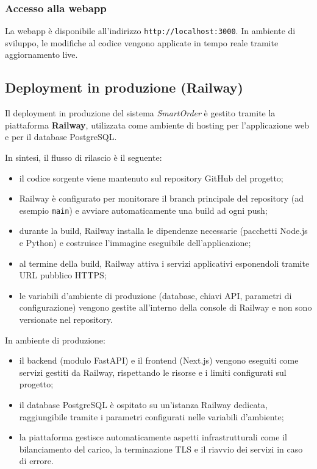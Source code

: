 \documentclass[a4paper, 11pt, oneside]{scrartcl}
\begin{document}
\subsubsection{Accesso alla webapp}
La webapp \`e disponibile all'indirizzo \texttt{http://localhost:3000}.
In ambiente di sviluppo, le modifiche al codice vengono applicate in tempo reale tramite aggiornamento live.

\subsection{Deployment in produzione (Railway)}

Il deployment in produzione del sistema \textit{SmartOrder} \`e gestito tramite la piattaforma \textbf{Railway}, utilizzata come ambiente di hosting per l'applicazione web e per il database PostgreSQL.

In sintesi, il flusso di rilascio \`e il seguente:
\begin{itemize}
    \item il codice sorgente viene mantenuto sul repository GitHub del progetto;
    \item Railway \`e configurato per monitorare il branch principale del repository (ad esempio \texttt{main}) e avviare automaticamente una build ad ogni push;
    \item durante la build, Railway installa le dipendenze necessarie (pacchetti Node.js e Python) e costruisce l'immagine eseguibile dell'applicazione;
    \item al termine della build, Railway attiva i servizi applicativi esponendoli tramite URL pubblico HTTPS;
    \item le variabili d'ambiente di produzione (database, chiavi API, parametri di configurazione) vengono gestite all'interno della console di Railway e non sono versionate nel repository.
\end{itemize}

In ambiente di produzione:
\begin{itemize}
    \item il backend (modulo FastAPI) e il frontend (Next.js) vengono eseguiti come servizi gestiti da Railway, rispettando le risorse e i limiti configurati sul progetto;
    \item il database PostgreSQL \`e ospitato su un'istanza Railway dedicata, raggiungibile tramite i parametri configurati nelle variabili d'ambiente;
    \item la piattaforma gestisce automaticamente aspetti infrastrutturali come il bilanciamento del carico, la terminazione TLS e il riavvio dei servizi in caso di errore.
\end{itemize}
\end{document}

